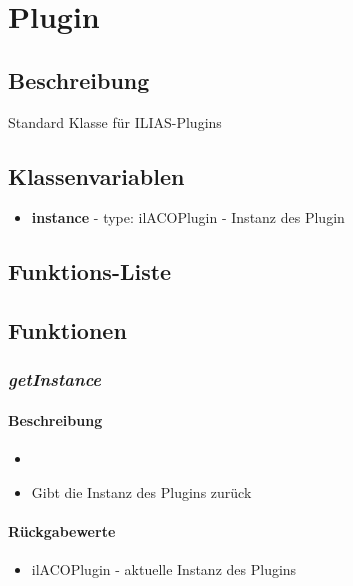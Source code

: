 \section{Plugin}

\subsection*{Beschreibung}
Standard Klasse für ILIAS-Plugins
\subsection*{Klassenvariablen}
\begin{itemize}
	\item[] \textbf{instance} - type: ilACOPlugin - Instanz des Plugin
\end{itemize}

\subsection*{Funktions-Liste}


\paragraph{}
\paragraph{}

\subsection*{Funktionen}

\subsubsection*{\textit{getInstance}}\label{getinstance}
\paragraph{Beschreibung}
\begin{itemize}
	\item[]\noindent{}
	\item[] Gibt die Instanz des Plugins zurück
\end{itemize}
\paragraph{Rückgabewerte}
\begin{itemize}
	\item[] ilACOPlugin - aktuelle Instanz des Plugins
\end{itemize}
